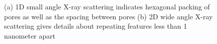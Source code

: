 \documentclass{article}
\newcommand{\angstrom}{\textup{\AA}}
\begin{document}
\begin{figure}
\begin{subfigure}[t]{0.47\linewidth}
{                }
                \caption{}\label{fig:WAXS}
        \end{subfigure}
        \caption{(a) 1D small angle X-ray scattering indicates hexagonal packing of
	pores as well as the spacing between pores (b) 2D wide angle X-ray scattering 
	gives details about repeating features less than 1 nanometer apart}\label{fig:SWAXS}
  \end{figure}



\end{document}
